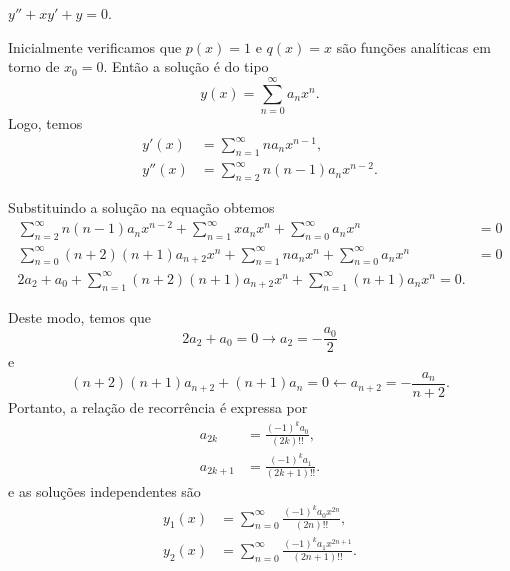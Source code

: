 \documentclass[a4paper,12pt, leqno, answers]{exam}
\begin{document}
\begin{questions}
    \question $y'' + x y' + y = 0$.
    \begin{solution}
        Inicialmente verificamos que $p(x) = 1$ e $q(x) = x$ s\~{a}o fun\c{c}\~{o}es anal\'{i}ticas em torno de $x_0 = 0$. Ent\~{a}o a solu\c{c}\~{a}o \'{e} do tipo
        \[
        y(x) = \sum_{n = 0}^\infty a_n x^n.
        \]
        Logo, temos
        \begin{align*}
            y'(x) &= \sum_{n = 1}^\infty n a_n x^{n - 1}, \\
            y''(x) &= \sum_{n = 2}^\infty n \left( n -1 \right) a_n x^{n -2}.
        \end{align*}

        Substituindo a solu\c{c}\~{a}o na equa\c{c}\~{a}o obtemos
        \begin{align*}
            \sum_{n = 2}^\infty n \left( n - 1 \right) a_n x^{n -2} + \sum_{n = 1}^\infty x a_n x^n + \sum_{n = 0}^\infty a_n x^n &= 0 \\
            \sum_{n = 0}^\infty \left( n + 2 \right) \left( n + 1 \right) a_{n + 2} x^n + \sum_{n = 1}^\infty n a_n x^n + \sum_{n = 0}^\infty a_n x^n &= 0 \\
            2 a_2 + a_0 + \sum_{n = 1}^\infty \left( n + 2 \right) \left( n + 1 \right) a_{n + 2} x^n + \sum_{n = 1}^\infty \left( n + 1 \right) a_n x^n = 0.
        \end{align*}

        Deste modo, temos que
        \[
        2 a_2 + a_0 = 0 \rightarrow a_2 = - \frac{a_0}{2}
        \]
        e
        \[
        \left( n + 2 \right) \left( n + 1 \right) a_{n + 2} + \left( n + 1 \right) a_n = 0 \leftarrow a_{n + 2} = - \frac{a_n}{n + 2}.
        \]
        Portanto, a rela\c{c}\~{a}o de recorr\^{e}ncia \'{e} expressa por
        \begin{align*}
            a_{2k} &= \frac{\left( -1 \right)^k a_0}{\left( 2k \right)!!}, \\
            a_{2k + 1} &= \frac{\left( -1 \right)^k a_1}{\left( 2k + 1 \right)!!}.
        \end{align*}
        e as solu\c{c}\~{o}es independentes s\~{a}o
        \begin{align*}
            y_1(x) &= \sum_{n = 0}^\infty \frac{\left( -1 \right)^k a_0 x^{2n}}{\left( 2n \right)!!}, \\
            y_2(x) &= \sum_{n = 0}^\infty \frac{\left( -1 \right)^k a_1 x^{2n + 1}}{\left( 2n + 1 \right)!!}.
        \end{align*}
    \end{solution}


\end{questions}
\end{document}
